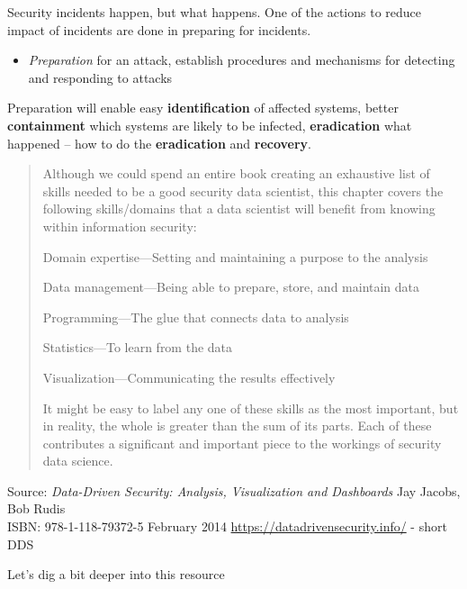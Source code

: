 \documentclass[Screen16to9,17pt]{foils}
\begin{document}


Security incidents happen, but what happens. One of the actions to reduce impact of incidents are done in preparing for incidents.

\begin{itemize}
\item \emph{Preparation} for an attack, establish procedures and mechanisms for detecting and responding to attacks
\end{itemize}

Preparation will enable easy {\bf identification} of affected systems, better {\bf containment} which systems are likely to be infected, {\bf eradication} what happened -- how to do the {\bf eradication} and {\bf recovery}.


\begin{quote}
Although we could spend an entire book creating an exhaustive list of skills needed to be a good security data scientist, this chapter covers the following skills/domains that a data scientist will benefit from
knowing within information security:
\begin{list2}
\item Domain expertise—Setting and maintaining a purpose to the analysis
\item Data management—Being able to prepare, store, and maintain data
\item Programming—The glue that connects data to analysis
\item Statistics—To learn from the data
\item Visualization—Communicating the results effectively
\end{list2}
It might be easy to label any one of these skills as the most important, but in reality, the whole is greater than the sum of its parts. Each of these contributes a significant and important piece to the workings of
security data science.
\end{quote}

Source: \emph{Data-Driven Security: Analysis, Visualization and Dashboards} Jay Jacobs, Bob Rudis\\
ISBN: 978-1-118-79372-5 February 2014 \url{https://datadrivensecurity.info/} - short DDS





Let's dig a bit deeper into this resource

\slidenext{}
\end{document}
